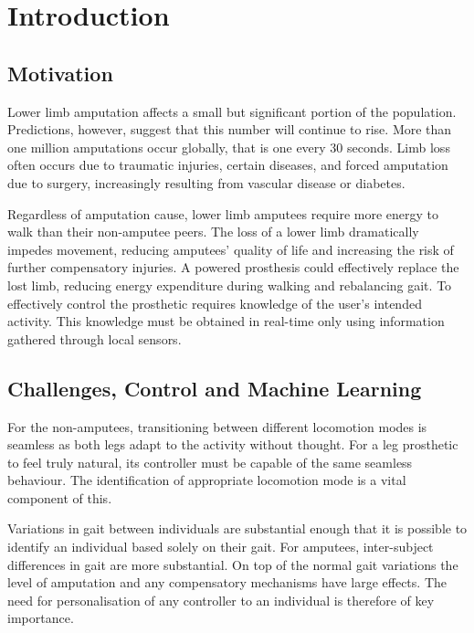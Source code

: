 \chapter{Introduction}
\label{chp:intro}

\section{Motivation}
Lower limb amputation affects a small but significant portion of the population. Predictions, however, suggest that this number will continue to rise. More than one million amputations occur globally, that is one every 30 seconds.\cite{Asif2021} Limb loss often occurs due to traumatic injuries, certain diseases, and forced amputation due to surgery, increasingly resulting from vascular disease or diabetes\cite{Griffin2012, Walter2022}. 

Regardless of amputation cause, lower limb amputees require more energy to walk than their non-amputee peers\cite{Vllasolli2014}. The loss of a lower limb dramatically impedes movement\cite{Gregg2014, Wong2021, Srisuwan2021}, reducing amputees' quality of life and increasing the risk of further compensatory injuries. A powered prosthesis could effectively replace the lost limb, reducing energy expenditure during walking and rebalancing gait\cite{Lin2014}. To effectively control the prosthetic requires knowledge of the user's intended activity. This knowledge must be obtained in real-time only using information gathered through local sensors.\cite{Tucker2015}

\section{Challenges, Control and Machine Learning}
For the non-amputees, transitioning between different locomotion modes is seamless as both legs adapt to the activity without thought. For a leg prosthetic to feel truly natural, its controller must be capable of the same seamless behaviour. The identification of appropriate locomotion mode is a vital component of this. 

Variations in gait between individuals are substantial enough that it is possible to identify an individual based solely on their gait\cite{Zeng2021, Kwon2021}. For amputees, inter-subject differences in gait are more substantial. On top of the normal gait variations the level of amputation and any compensatory mechanisms have large effects. The need for personalisation of any controller to an individual is therefore of key importance.

